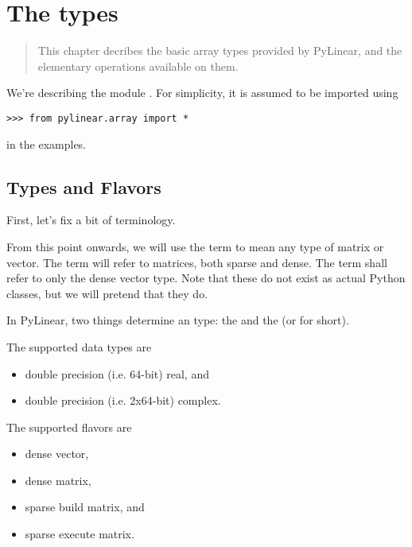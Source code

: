 \chapter{The  types}
\begin{quote}
   This chapter decribes the basic array types provided by PyLinear, and
   the elementary operations available on them.
\end{quote}

We're describing the module . For simplicity, it is
assumed to be imported using
\begin{verbatim}
>>> from pylinear.array import *
\end{verbatim}
in the examples.

\section{Types and Flavors}
\label{sec:types-and-flavors}

First, let's fix a bit of terminology. 

From this point onwards, we will use the term  to
mean any type of matrix or vector. The term  will
refer to matrices, both sparse and dense. The term 
shall refer to only the dense vector type. Note that these do not exist as
actual Python classes, but we will pretend that they do.

In PyLinear, two things determine an  type: the
 and the  (or
 for short).

The supported data types are
\begin{itemize}
  \item double precision (i.e. 64-bit) real, and
  \item double precision (i.e. 2x64-bit) complex.
\end{itemize}

The supported flavors are
\begin{itemize}
  \item dense vector,
  \item dense matrix,
  \item sparse build matrix, and
  \item sparse execute matrix.
\end{itemize}

